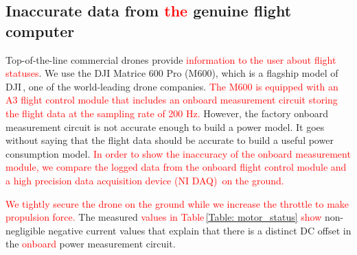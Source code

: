 \documentclass[journal]{./template/IEEEtran}
\begin{document}
\subsection{Inaccurate data from \textcolor{red}{the} genuine flight computer}

Top-of-the-line commercial drones provide \textcolor{red}{information to the user about flight statuses}. 
We use the DJI Matrice 600 Pro (M600), which is a flagship model of DJI\,\cite{ref_11}, one of the world-leading drone companies. 
\textcolor{red}{The M600 is equipped with an A3 flight control module that includes an onboard measurement circuit storing the flight data at the sampling rate of 200 Hz.} 
However, the factory onboard measurement circuit is not accurate enough to build a power model. 
It goes without saying that the flight data should be accurate to build a useful power consumption model.
\textcolor{red}{In order to show the inaccuracy of the onboard measurement module, we compare the logged data from the onboard flight control module and a high precision data acquisition device (NI DAQ)\,\cite{ref_12} on the ground.}

\begin{table}[ht]
\caption{\textcolor{red}{The logged power consumption data from the genuine flight module of M600 without turning on the propulsion.}}
\label{Table: motor_status}
\end{table}

\noindent\textcolor{red}{We tightly secure the drone on the ground while we increase the throttle to make propulsion force.}
The measured \textcolor{red}{values in Table\,\ref{Table: motor_status} show} non-negligible negative current values that explain that there is a distinct DC offset in the \textcolor{red}{onboard} power measurement circuit.
\end{document}
